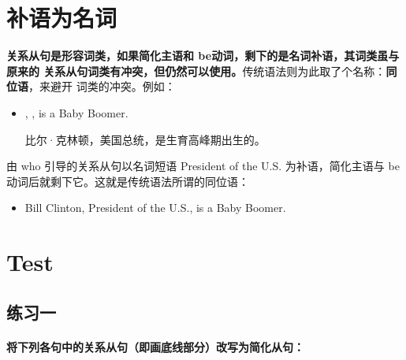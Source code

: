 \section{补语为名词}

\textbf{关系从句是形容词类，如果简化主语和 be动词，剩下的是名词补语，其词类虽与原来的
关系从句词类有冲突，但仍然可以使用。}传统语法则为此取了个名称：\textbf{同位语}，来避开
词类的冲突。例如：
\begin{itemize}
\item {}, ,
  is a Baby Boomer.

  比尔·克林顿，美国总统，是生育高峰期出生的。
\end{itemize}
由 who 引导的关系从句以名词短语 President of the U.S. 为补语，简化主语与
be 动词后就剩下它。这就是传统语法所谓的同位语：
\begin{itemize}
\item Bill Clinton, President of the U.S., is a Baby Boomer.
\end{itemize}

\section{Test}

\subsection{练习一}

\paragraph{将下列各句中的关系从句（即画底线部分）改写为简化从句：}

